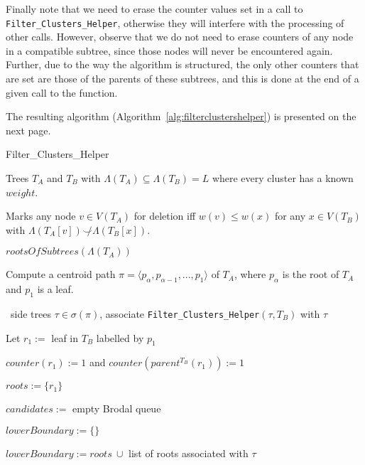 \documentclass{article}
\newcommand{\compatible}{\smile}
\newcommand{\leafset}{\Lambda}
\begin{document}
    Finally note that we need to erase the counter values set in a call to \texttt{Filter\_Clusters\_Helper}, otherwise they will interfere with the processing of other calls. However, observe that we do not need to erase counters of any node in a compatible subtree, since those nodes will never be encountered again. Further, due to the way the algorithm is structured, the only other counters that are set are those of the parents of these subtrees, and this is done at the end of a given call to the function.

    The resulting algorithm (Algorithm~\ref{alg:filterclustershelper}) is presented on the next page.

    \begin{algorithm}
        \caption{Filter\_Clusters\_Helper}
        \label{alg:filterclustershelper}

        \begin{algorithmic}[1]
            \Input Trees $T_A$ and $T_B$ with $\leafset(T_A) \subseteq \leafset(T_B) = L$ where every cluster has a known $weight$.

            \SideEffect Marks any node $v \in V(T_A)$ for deletion iff $w(v) \leq w(x)$ for any $x \in V(T_B)$ with $\leafset(T_A[v]) \not\compatible \leafset(T_B[x])$.

            \Output $rootsOfSubtrees(\leafset(T_A))$

            \State Compute a centroid path $\pi = \langle p_{\alpha}, p_{\alpha - 1}, ..., p_1 \rangle$ of $T_A$, where $p_{\alpha}$ is the root of $T_A$ and $p_1$ is a leaf.

            \State \algorithmicforall\ side trees $\tau \in \sigma(\pi)$,
                associate \texttt{Filter\_Clusters\_Helper}$(\tau, T_B)$ with $\tau$

            \State Let $r_1 :=$ leaf in $T_B$ labelled by $p_1$

            \State $counter(r_1) := 1$ and $counter(parent^{T_B}(r_1)) := 1$

            \State $roots := \{r_1\}$

            \State $candidates :=$ empty Brodal queue

                \State $lowerBoundary := \{\}$

                    \State $lowerBoundary := roots\ \cup$ list of roots associated with $\tau$
                \EndFor


\end{algorithmic}
\end{algorithm}
\end{document}
